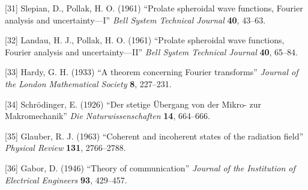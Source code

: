 \documentclass[
]{article}
\begin{document}
{[}31{]} Slepian, D., Pollak, H. O. (1961) ``Prolate spheroidal wave
functions, Fourier analysis and uncertainty---I'' \emph{Bell System
Technical Journal} \textbf{40}, 43--63.

{[}32{]} Landau, H. J., Pollak, H. O. (1961) ``Prolate spheroidal wave
functions, Fourier analysis and uncertainty---II'' \emph{Bell System
Technical Journal} \textbf{40}, 65--84.

{[}33{]} Hardy, G. H. (1933) ``A theorem concerning Fourier transforms''
\emph{Journal of the London Mathematical Society} \textbf{8}, 227--231.

{[}34{]} Schrödinger, E. (1926) ``Der stetige Übergang von der Mikro-
zur Makromechanik'' \emph{Die Naturwissenschaften} \textbf{14},
664--666.

{[}35{]} Glauber, R. J. (1963) ``Coherent and incoherent states of the
radiation field'' \emph{Physical Review} \textbf{131}, 2766--2788.

{[}36{]} Gabor, D. (1946) ``Theory of communication'' \emph{Journal of
the Institution of Electrical Engineers} \textbf{93}, 429--457.
\end{document}
